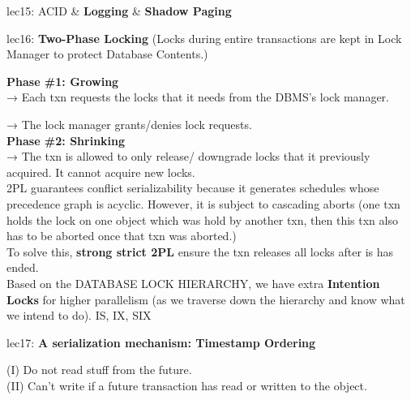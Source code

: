 \documentclass[letterpaper,11pt]{exam}
\newenvironment{indented}{\par\setlength{\parindent}{3em}}{\par}
\begin{document}
lec15: ACID \& \textbf{Logging} \& \textbf{Shadow Paging} \\

\vspace*{3em}

lec16: \textbf{Two-Phase Locking} (Locks during entire transactions are kept in Lock Manager to protect Database Contents.) \\

\begin{adjustwidth}{2em}{0pt}
  \textbf{Phase \#1: Growing} \\

  → Each txn requests the locks that it needs from the DBMS's
  lock manager.
  
  → The lock manager grants/denies lock requests. \\
  
  \textbf{Phase \#2: Shrinking} \\

  → The txn is allowed to only release/ downgrade locks that it previously acquired. It cannot acquire new locks. \\
  
  2PL guarantees conflict serializability because it generates schedules whose precedence graph is acyclic. However, it is subject to cascading aborts (one txn holds the lock on one object which was hold by another txn, then this txn also has to be aborted once that txn was aborted.) \\
  
  To solve this, \textbf{strong strict 2PL} ensure the txn releases all locks after is has ended. \\
  
  Based on the DATABASE LOCK HIERARCHY, we have extra \textbf{Intention Locks} for higher parallelism (as we traverse down the hierarchy and know what we intend to do). {IS, IX, SIX}\\

\end{adjustwidth}

\vspace*{3em}
lec17: \textbf{A serialization mechanism: Timestamp Ordering}
\begin{adjustwidth}{2em}{0pt}
  \begin{spacing}{1.2}
  (I) Do not read stuff from the future. \\
  (II) Can't write if a future transaction has read or written to the object. \\
    \end{spacing}
\end{adjustwidth}
\end{document}

